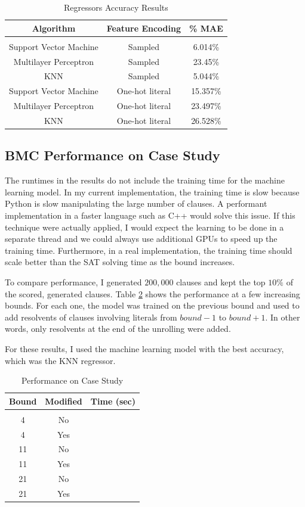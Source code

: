 \documentclass[letterpaper]{article} %
\begin{document}
\begin{table}[h!]
\centering
\begin{tabular}{ c | c | c }
Algorithm & Feature Encoding & \% MAE \\
\hline \\
Support Vector Machine & Sampled & 6.014\% \\
Multilayer Perceptron & Sampled & 23.45\% \\
KNN & Sampled & 5.044\% \\ 
Support Vector Machine & One-hot literal & 15.357\% \\
Multilayer Perceptron & One-hot literal & 23.497\% \\
KNN & One-hot literal & 26.528\% 
\end{tabular}
\caption{Regressors Accuracy Results}
\label{acc-reg}
\end{table}

\subsection{BMC Performance on Case Study}

The runtimes in the results do not include the training time for the machine learning model. In my current implementation, the training time is slow because Python is slow manipulating the large number of clauses. A performant implementation in a faster language such as C++ would solve this issue. If this technique were actually applied, I would expect the learning to be done in a separate thread and we could always use additional GPUs to speed up the training time. Furthermore, in a real implementation, the training time should scale better than the SAT solving time as the bound increases.

To compare performance, I generated $200,000$ clauses and kept the top $10\%$ of the scored, generated clauses. Table \ref{benchmark} shows the performance at a few increasing bounds. For each one, the model was trained on the previous bound and used to add resolvents of clauses involving literals from $bound-1$ to $bound+1$. In other words, only resolvents at the end of the unrolling were added.

For these results, I used the machine learning model with the best accuracy, which was the KNN regressor.

\begin{table}[h!]
\centering
\begin{tabular}{ c | c | c }
Bound & Modified & Time (sec) \\
\hline \\
4 & No & \\
4 & Yes & \\
11 & No & \\
11 & Yes & \\
21 & No & \\
21 & Yes & \\
\end{tabular}
\caption{Performance on Case Study}
\label{benchmark}
\end{table}
\end{document}
